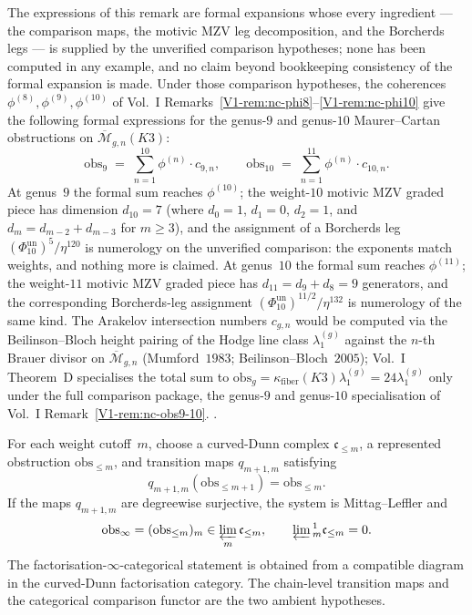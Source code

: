\begin{remark}
\label{rem:cdhg-obs-9-10}
The expressions of this remark are formal expansions whose every
ingredient --- the comparison maps, the motivic MZV leg
decomposition, and the Borcherds legs --- is supplied by the
unverified comparison hypotheses; none has been computed in any
example, and no claim beyond bookkeeping consistency of the formal
expansion is made. Under those comparison hypotheses, the coherences
$\phi^{(8)}, \phi^{(9)}, \phi^{(10)}$ of Vol.~I
Remarks~\ref{V1-rem:nc-phi8}--\ref{V1-rem:nc-phi10}
give the following formal expressions for the genus-$9$ and genus-$10$
Maurer--Cartan obstructions on
$\overline{\mathcal M}_{g,n}(K3)$:
\[
\mathrm{obs}_{9} \;=\; \sum_{n=1}^{10}\phi^{(n)}\cdot c_{9,n},
\qquad
\mathrm{obs}_{10} \;=\; \sum_{n=1}^{11}\phi^{(n)}\cdot c_{10,n}.
\]
At genus~$9$ the formal sum reaches $\phi^{(10)}$; the weight-$10$
motivic MZV graded piece has dimension
$d_{10}=7$ (where
$d_0=1$, $d_1=0$, $d_2=1$, and
$d_m=d_{m-2}+d_{m-3}$ for $m\geq3$), and the assignment of a
Borcherds leg
$(\Phi_{10}^{\mathrm{un}})^{5}/\eta^{120}$ is numerology on the
unverified comparison: the exponents match weights, and nothing
more is claimed. At genus~$10$ the formal sum reaches
$\phi^{(11)}$; the weight-$11$ motivic MZV graded piece has
$d_{11}=d_9+d_8=9$ generators, and the corresponding
Borcherds-leg assignment
$(\Phi_{10}^{\mathrm{un}})^{11/2}/\eta^{132}$ is numerology of the
same kind. The Arakelov
intersection numbers $c_{g,n}$ would be computed via the
Beilinson--Bloch height pairing of the Hodge line class
$\lambda_1^{(g)}$
against the $n$-th Brauer divisor on $\overline{\mathcal M}_{g,n}$
(Mumford~$1983$; Beilinson--Bloch~$2005$); Vol.~I Theorem~D
specialises the total sum to
$\mathrm{obs}_g = \kappa_{\mathrm{fiber}}(K3)\lambda_1^{(g)}
= 24\lambda_1^{(g)}$ only under the full comparison package, the
genus-\(9\) and genus-\(10\)
specialisation of Vol.~I Remark~\ref{V1-rem:nc-obs9-10}.
\cite{Mumford1983,BeilinsonBloch2005,Brown2011,Deligne2013,
 GritsenkoNikulin1998}.
\end{remark}

\begin{remark}
\label{rem:cdhg-obs-infty}
For each weight cutoff~$m$, choose a curved-Dunn complex
$\mathfrak c_{\leq m}$, a represented obstruction
$\mathrm{obs}_{\leq m}$, and transition maps $q_{m+1,m}$ satisfying
\[
 q_{m+1,m}(\mathrm{obs}_{\leq m+1})
 =\mathrm{obs}_{\leq m}.
\]
If the maps $q_{m+1,m}$ are degreewise surjective, the system is
Mittag--Leffler and
\[
 \mathrm{obs}_\infty=(\mathrm{obs}_{\leq m})_m
 \in\varprojlim_m\mathfrak c_{\leq m},
 \qquad
 \varprojlim{}^1_m\mathfrak c_{\leq m}=0.
\]
The factorisation-$\infty$-categorical statement is obtained from a
compatible diagram in the curved-Dunn factorisation category.  The
chain-level transition maps and the categorical comparison functor
are the two ambient hypotheses.
\end{remark}

